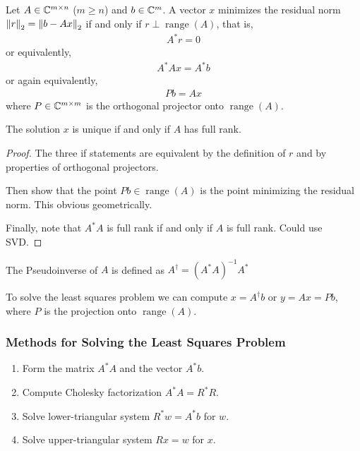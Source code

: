 \documentclass[12pt]{article}
\begin{document}
\begin{theorem}
Let \( A\in\mathbb{C}^{m\times n} \) (\( m\geq n \)) and \( b\in\mathbb{C}^m \). A vector \( x \) minimizes the residual norm \( \left\lVert r\right\rVert_2 = \left\lVert b-Ax\right\rVert_2 \) if and only if \( r \perp \operatorname{range}(A) \), that is,
\begin{align*}
    A^*r = 0
\end{align*}
or equivalently,
\begin{align*}
    A^*Ax = A^*b
\end{align*}
or again equivalently,
\begin{align*}
    Pb = Ax
\end{align*}
where \( P\in\mathbb{C}^{m\times m} \) is the orthogonal projector onto \( \operatorname{range}(A) \).

The solution \( x \) is unique if and only if \( A \) has full rank.
\end{theorem}

\begin{proof}
The three if statements are equivalent by the definition of \( r \) and by properties of orthogonal projectors.

Then show that the point \( Pb \in \operatorname{range}(A) \) is the point minimizing the residual norm. This obvious geometrically.

Finally, note that \( A^*A \) is full rank if and only if \( A \) is full rank. Could use SVD.
\end{proof}

\begin{definition}[Pseudoinverse]
The Pseudoinverse of \( A \) is defined as \( A^\dagger = (A^*A)^{-1}A^* \)
\end{definition}

To solve the least squares problem we can compute \( x = A^\dagger b \) or \( y = Ax = P b \), where \( P \) is the projection onto \( \operatorname{range}(A) \).

\subsubsection{Methods for Solving the Least Squares Problem}
\begin{method}
\begin{enumerate}[nolistsep]
    \item Form the matrix \( A^*A \) and the vector \( A^*b \).
    \item Compute Cholesky factorization \( A^*A = R^*R \).
    \item Solve lower-triangular system \( R^*w = A^*b \) for \( w \).
    \item Solve upper-triangular system \( Rx = w \) for \( x \).
\end{enumerate}
\end{method}
\end{document}
